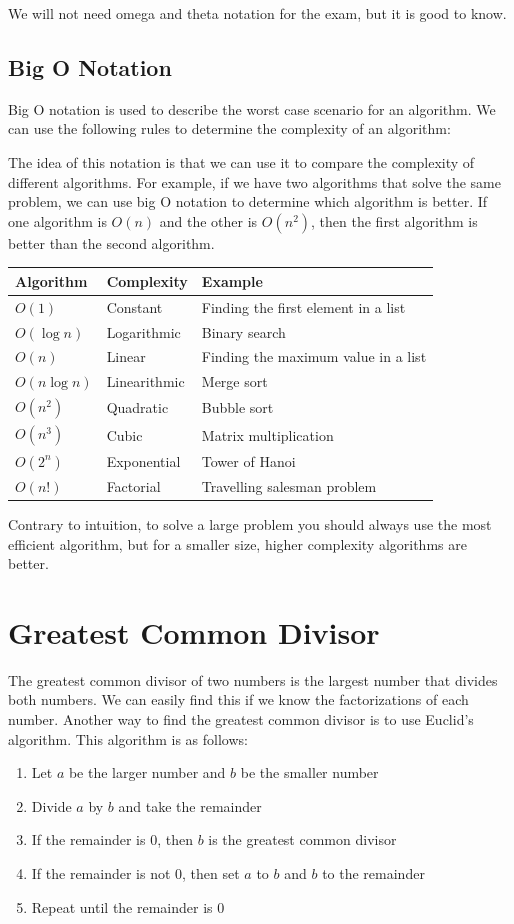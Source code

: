 \documentclass[11pt]{article}
\begin{document}
We will not need omega and theta notation for the exam, but it is good to know.
\subsection{Big O Notation}
\label{sec:org7f55609}
Big O notation is used to describe the worst case scenario for an algorithm. We can use the following rules to determine the complexity of an algorithm:

The idea of this notation is that we can use it to compare the complexity of different algorithms. For example, if we have two algorithms that solve the same problem, we can use big O notation to determine which algorithm is better. If one algorithm is \(O(n)\) and the other is \(O(n^2)\), then the first algorithm is better than the second algorithm.

\begin{center}
\begin{tabular}{lll}
Algorithm & Complexity & Example\\
\hline
\(O(1)\) & Constant & Finding the first element in a list\\
\(O(\log n)\) & Logarithmic & Binary search\\
\(O(n)\) & Linear & Finding the maximum value in a list\\
\(O(n \log n)\) & Linearithmic & Merge sort\\
\(O(n^2)\) & Quadratic & Bubble sort\\
\(O(n^3)\) & Cubic & Matrix multiplication\\
\(O(2^n)\) & Exponential & Tower of Hanoi\\
\(O(n!)\) & Factorial & Travelling salesman problem\\
\end{tabular}
\end{center}

Contrary to intuition, to solve a large problem you should always use the most efficient algorithm, but for a smaller size, higher complexity algorithms are better.

\section{Greatest Common Divisor}
\label{sec:orgf11c424}
The greatest common divisor of two numbers is the largest number that divides both numbers. We can easily find this if we know the factorizations of each number. Another way to find the greatest common divisor is to use Euclid's algorithm. This algorithm is as follows:
\begin{enumerate}
\item Let \(a\) be the larger number and \(b\) be the smaller number
\item Divide \(a\) by \(b\) and take the remainder
\item If the remainder is 0, then \(b\) is the greatest common divisor
\item If the remainder is not 0, then set \(a\) to \(b\) and \(b\) to the remainder
\item Repeat until the remainder is 0
\end{enumerate}
\end{document}
